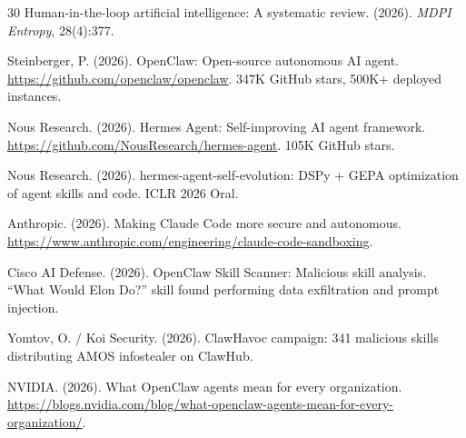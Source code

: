 \documentclass[10pt]{article}
\begin{document}
\begin{thebibliography}{30}
Human-in-the-loop artificial intelligence: A systematic review. (2026). \emph{MDPI Entropy}, 28(4):377.

Steinberger, P. (2026). OpenClaw: Open-source autonomous AI agent. \url{https://github.com/openclaw/openclaw}. 347K GitHub stars, 500K+ deployed instances.

Nous Research. (2026). Hermes Agent: Self-improving AI agent framework. \url{https://github.com/NousResearch/hermes-agent}. 105K GitHub stars.

Nous Research. (2026). hermes-agent-self-evolution: DSPy + GEPA optimization of agent skills and code. ICLR 2026 Oral.

Anthropic. (2026). Making Claude Code more secure and autonomous. \url{https://www.anthropic.com/engineering/claude-code-sandboxing}.

Cisco AI Defense. (2026). OpenClaw Skill Scanner: Malicious skill analysis. ``What Would Elon Do?'' skill found performing data exfiltration and prompt injection.

Yomtov, O. / Koi Security. (2026). ClawHavoc campaign: 341 malicious skills distributing AMOS infostealer on ClawHub.

NVIDIA. (2026). What OpenClaw agents mean for every organization. \url{https://blogs.nvidia.com/blog/what-openclaw-agents-mean-for-every-organization/}.


\end{thebibliography}
\end{document}
